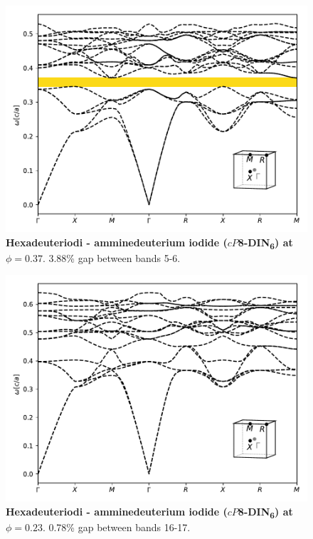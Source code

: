 \documentclass[fleqn,amsmath,amssymb,superscriptaddress, reprint,prl]{revtex4-1}
\begin{document}
\begin{figure}
\includegraphics[width=0.9\linewidth]{workspace/3eec9bd6b882ec5a4682dd737d9af0b3/images/r=25.pdf}
	\caption{\textbf{Hexadeuteriodi - amminedeuterium iodide ($cP$8-DIN\textsubscript{6}) at $\phi=0.37$}. 3.88\% gap between bands 5-6.}
\end{figure}

\begin{figure}
\includegraphics[width=0.9\linewidth]{workspace/3eec9bd6b882ec5a4682dd737d9af0b3/images/r=20.pdf}
	\caption{\textbf{Hexadeuteriodi - amminedeuterium iodide ($cP$8-DIN\textsubscript{6}) at $\phi=0.23$}. 0.78\% gap between bands 16-17.}
\end{figure}
\end{document}
